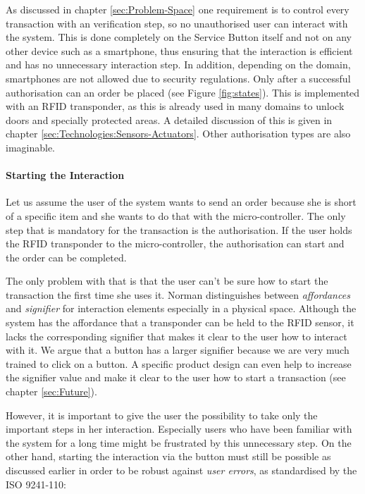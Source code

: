 As discussed in chapter \ref{sec:Problem-Space} one requirement is to control every transaction with an verification step, so no unauthorised user can interact with the system. This is done completely on the Service Button itself and not on any other device such as a smartphone, thus ensuring that the interaction is efficient and has no unnecessary interaction step. In addition, depending on the domain, smartphones are not allowed due to security regulations. Only after a successful authorisation can an order be placed (see Figure \ref{fig:states}). This is implemented with an RFID transponder, as this is already used in many domains to unlock doors and specially protected areas. A detailed discussion of this is given in chapter \ref{sec:Technologies:Sensors-Actuators}. Other authorisation types are also imaginable.

\paragraph{Starting the Interaction}
Let us assume the user of the system wants to send an order because she is short of a specific item and she wants to do that with the micro-controller. The only step that is mandatory for the transaction is the authorisation. If the user holds the RFID transponder to the micro-controller, the authorisation can start and the order can be completed.

The only problem with that is that the user can't be sure how to start the transaction the first time she uses it. Norman distinguishes between \textit{affordances} and \textit{signifier} for interaction elements \cite{Norman:EverydayThings:2013} especially in a physical space. Although the system has the affordance that a transponder can be held to the RFID sensor, it lacks the corresponding signifier that makes it clear to the user how to interact with it. We argue that a button has a larger signifier because we are very much trained to click on a button. A specific product design can even help to increase the signifier value and make it clear to the user how to start a transaction (see chapter \ref{sec:Future}).

However, it is important to give the user the possibility to take only the important steps in her interaction. Especially users who have been familiar with the system for a long time might be frustrated by this unnecessary step. On the other hand, starting the interaction via the button must still be possible as discussed earlier in order to be robust against \textit{user errors}, as standardised by the ISO 9241-110:

